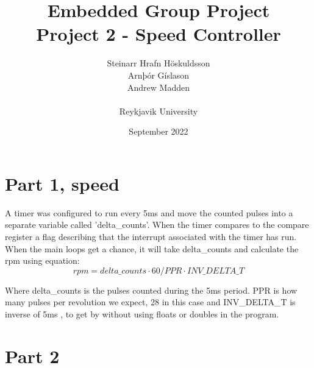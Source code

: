 \documentclass{article}
\title{Embedded Group Project\\ \large Project 2 - Speed Controller}
\author{Steinarr Hrafn Höskuldsson\\
Arnþór Gíslason\\
Andrew Madden\\
\\
Reykjavik University}
\date{September 2022}
\newcommand{\mycomment}[1]{}
\newcommand{\timerinterval}{5ms }
\begin{document}
\maketitle
\mycomment{
\begin{figure}[h]
    \centering
    \texttt{[image: LAB3/Basic1.png]}
    \caption{"Switch test" Breadboard set up}
    \label{fig:Switch_test}
\end{figure}



}

\section{Part 1, speed}
A timer was configured to run every \timerinterval and move the counted pulses into a separate variable called 'delta\_counts'. When the timer compares to the compare register a flag describing that the interrupt associated with the timer has run. 
When the main loops get a chance, it will take delta\_counts and calculate the rpm using equation: 
\begin{equation}
     rpm = delta\_counts \cdot 60 / PPR \cdot INV\_DELTA\_T
\end{equation}

Where delta\_counts is the pulses counted during the \timerinterval period. PPR is how many pulses per revolution we expect, 28 in this case and INV\_DELTA\_T is inverse of \timerinterval, to get by without using floats or doubles in the program.

\subsection{}

\section{Part 2}
\end{document}
